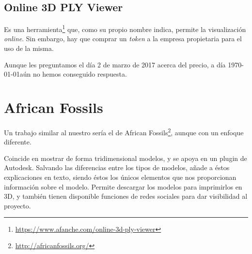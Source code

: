 \subsection{Online 3D PLY Viewer}
Es una herramienta\footnote{\url{https://www.afanche.com/online-3d-ply-viewer}} que, como su propio nombre indica, permite la visualización \textit{online}. Sin embargo, hay que comprar un \textit{token} a la empresa propietaria para el uso de la misma.

Aunque les preguntamos el día 2 de marzo de 2017 acerca del precio, a día \today \space aún no hemos conseguido respuesta.

\section{African Fossils}
Un trabajo similar al nuestro sería el de African Fossils\footnote{\url{http://africanfossils.org/}}, aunque con un enfoque diferente.

Coincide en mostrar de forma tridimensional modelos, y se apoya en un plugin de Autodesk. Salvando las diferencias entre los tipos de modelos, añade a éstos explicaciones en texto, siendo éstos los únicos elementos que nos proporcionan información sobre el modelo. Permite descargar los modelos para imprimirlos en 3D, y también tienen disponible funciones de redes sociales para dar visibilidad al proyecto.

